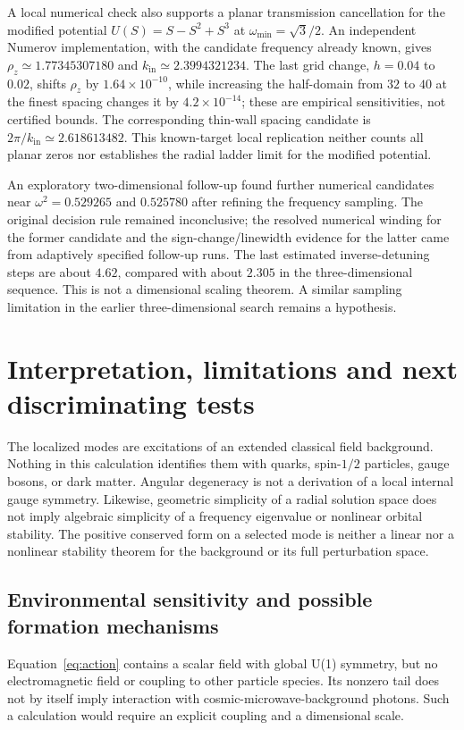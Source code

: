\documentclass[a4paper,11pt]{article}
\begin{document}
A local numerical check also supports a planar transmission cancellation
for the modified potential $U(S)=S-S^2+S^3$ at
$\omega_{\min}=\sqrt{3}/2$. An independent Numerov implementation,
with the candidate frequency already known, gives
$\rho_z\simeq1.77345307180$ and $k_{\mathrm{in}}\simeq2.3994321234$.
The last grid change, $h=0.04$ to $0.02$, shifts $\rho_z$ by
$1.64\times10^{-10}$, while increasing the half-domain from $32$ to $40$
at the finest spacing changes it by $4.2\times10^{-14}$; these are
empirical sensitivities, not certified bounds. The corresponding thin-wall
spacing candidate is $2\pi/k_{\mathrm{in}}\simeq2.618613482$. This known-target
local replication neither counts all planar zeros nor establishes the
radial ladder limit for the modified potential.

An exploratory two-dimensional follow-up found further numerical
candidates near $\omega^2=0.529265$ and $0.525780$ after refining the
frequency sampling. The original decision rule remained inconclusive;
the resolved numerical winding for the former candidate and the
sign-change/linewidth evidence for the latter came from adaptively
specified follow-up runs. The last estimated inverse-detuning steps are
about $4.62$, compared with about $2.305$ in the three-dimensional sequence.
This is not a dimensional scaling theorem. A similar sampling limitation
in the earlier three-dimensional search remains a hypothesis.




\section{Interpretation, limitations and next discriminating tests}
The localized modes are excitations of an extended classical field
background. Nothing in this calculation identifies them with quarks,
spin-$1/2$ particles, gauge bosons, or dark matter. Angular degeneracy is
not a derivation of a local internal gauge symmetry. Likewise, geometric
simplicity of a radial solution space does not imply algebraic simplicity
of a frequency eigenvalue or nonlinear orbital stability.
The positive conserved form on a selected mode is neither a linear nor a
nonlinear stability theorem for the background or its full perturbation space.

\subsection{Environmental sensitivity and possible formation mechanisms}
Equation~\eqref{eq:action} contains a scalar field with global U(1)
symmetry, but no electromagnetic field or coupling to other particle
species. Its nonzero tail does not by itself imply interaction with
cosmic-microwave-background photons. Such a calculation would require
an explicit coupling and a dimensional scale.
\end{document}
